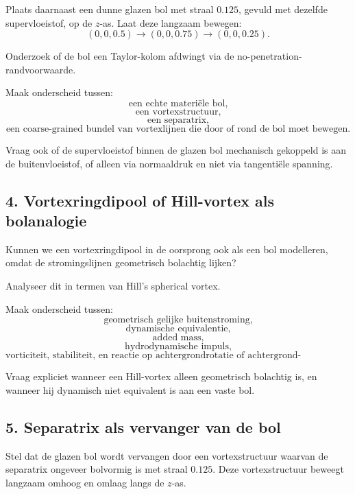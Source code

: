 \documentclass[11pt]{article}
\begin{document}
        Plaats daarnaast een dunne glazen bol met straal \(0.125\), gevuld met dezelfde supervloeistof, op de \(z\)-as. Laat deze langzaam bewegen:
        \[
            (0,0,0.5)
            \rightarrow
            (0,0,0.75)
            \rightarrow
            (0,0,0.25).
        \]
        
        Onderzoek of de bol een Taylor-kolom afdwingt via de no-penetration-randvoorwaarde.
        
        Maak onderscheid tussen:
        \[
            \text{een echte materiële bol,}
        \]
        \[
            \text{een vortexstructuur,}
        \]
        \[
            \text{een separatrix,}
        \]
        \[
            \text{een coarse-grained bundel van vortexlijnen die door of rond de bol moet bewegen.}
        \]
        
        Vraag ook of de supervloeistof binnen de glazen bol mechanisch gekoppeld is aan de buitenvloeistof, of alleen via normaaldruk en niet via tangentiële spanning.
    
    \subsection{4. Vortexringdipool of Hill-vortex als bolanalogie}
        
        Kunnen we een vortexringdipool in de oorsprong ook als een bol modelleren, omdat de stromingslijnen geometrisch bolachtig lijken?
        
        Analyseer dit in termen van Hill's spherical vortex.
        
        Maak onderscheid tussen:
        \[
            \text{geometrisch gelijke buitenstroming,}
        \]
        \[
            \text{dynamische equivalentie,}
        \]
        \[
            \text{added mass,}
        \]
        \[
            \text{hydrodynamische impuls,}
        \]
        \[
            \text{vorticiteit, stabiliteit, en reactie op achtergrondrotatie of achtergrond-vortexlijnen.}
        \]
        
        Vraag expliciet wanneer een Hill-vortex alleen geometrisch bolachtig is, en wanneer hij dynamisch niet equivalent is aan een vaste bol.
    
    \subsection{5. Separatrix als vervanger van de bol}
        
        Stel dat de glazen bol wordt vervangen door een vortexstructuur waarvan de separatrix ongeveer bolvormig is met straal \(0.125\). Deze vortexstructuur beweegt langzaam omhoog en omlaag langs de \(z\)-as.
        
\end{document}
